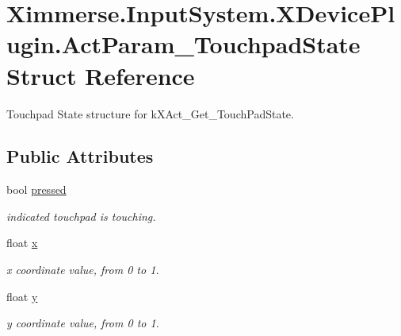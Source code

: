 \hypertarget{struct_ximmerse_1_1_input_system_1_1_x_device_plugin_1_1_act_param___touchpad_state}{}\section{Ximmerse.\+Input\+System.\+X\+Device\+Plugin.\+Act\+Param\+\_\+\+Touchpad\+State Struct Reference}
\label{struct_ximmerse_1_1_input_system_1_1_x_device_plugin_1_1_act_param___touchpad_state}


Touchpad State structure for k\+X\+Act\+\_\+\+Get\+\_\+\+Touch\+Pad\+State.  


\subsection*{Public Attributes}
\begin{DoxyCompactItemize}
\item 
\mbox{\label{struct_ximmerse_1_1_input_system_1_1_x_device_plugin_1_1_act_param___touchpad_state_abd20ab568b26fb9059cd0b2e813e0d29}} 
bool \mbox{\hyperlink{struct_ximmerse_1_1_input_system_1_1_x_device_plugin_1_1_act_param___touchpad_state_abd20ab568b26fb9059cd0b2e813e0d29}{pressed}}
\begin{DoxyCompactList}\small\item\em indicated touchpad is touching. \end{DoxyCompactList}\item 
\mbox{\label{struct_ximmerse_1_1_input_system_1_1_x_device_plugin_1_1_act_param___touchpad_state_a8b79fa166cbdd4490fc05a846ce75342}} 
float \mbox{\hyperlink{struct_ximmerse_1_1_input_system_1_1_x_device_plugin_1_1_act_param___touchpad_state_a8b79fa166cbdd4490fc05a846ce75342}{x}}
\begin{DoxyCompactList}\small\item\em x coordinate value, from 0 to 1. \end{DoxyCompactList}\item 
\mbox{\label{struct_ximmerse_1_1_input_system_1_1_x_device_plugin_1_1_act_param___touchpad_state_a8ff3f6e30b7a50d29e0439c4a99544d9}} 
float \mbox{\hyperlink{struct_ximmerse_1_1_input_system_1_1_x_device_plugin_1_1_act_param___touchpad_state_a8ff3f6e30b7a50d29e0439c4a99544d9}{y}}
\begin{DoxyCompactList}\small\item\em y coordinate value, from 0 to 1. \end{DoxyCompactList}\end{DoxyCompactItemize}


